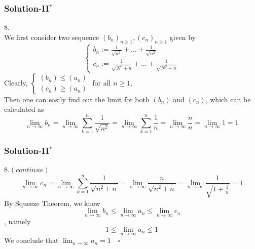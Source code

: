 \documentclass[12pt, t]{beamer}
\begin{document}
\begin{frame}
    \frametitle{Solution-II$^*$}
8.\\
\hspace{1em} We first consider two sequence $(b_n)_{n\geq 1},(c_n)_{n\geq 1}$ given by 
\begin{equation*}
    \begin{cases}
        b_n:=\frac{1}{\sqrt{n^2}}+\dots+\frac{1}{\sqrt{n^2}}\\
        c_n:=\frac{1}{\sqrt{N^2+n}}+\dots+\frac{1}{\sqrt{N^2+n}}
    \end{cases}
\end{equation*}
\hspace{1em} Clearly, 
$\begin{cases}
    (b_n)\leq (a_n)\\
    (c_n)\geq (a_n)
\end{cases}$ 
for all $n\geq 1$. \\
\hspace{1em} Then one can easily find out the limit for both $(b_n)$ and $(c_n)$, which can be calculated as 
\begin{equation*}
    \lim_{n\rightarrow\infty}b_n=\lim_{n\rightarrow \infty}\sum^n_{k=1}\frac{1}{\sqrt{n^2}}=\lim_{n\rightarrow \infty}\sum^n_{k=1}\frac{1}{n}=\lim_{n\rightarrow\infty}\frac{n}{n}=\lim_{n\rightarrow\infty}1=1
\end{equation*}
\end{frame}

\begin{frame}
    \frametitle{Solution-II$^*$}
8.$(continue)$\\
\begin{equation*}
    \lim_{n\rightarrow\infty}c_n=\lim_{n\rightarrow \infty}\sum^n_{k=1}\frac{1}{\sqrt{n^2+n}}=\lim_{n\rightarrow \infty}\frac{n}{\sqrt{n^2+n}}=\lim_{n\rightarrow\infty}\frac{1}{\sqrt{1+\frac{1}{n}}}=1
\end{equation*}
\hspace{1em} By Squeeze Theorem, we know 
\begin{equation*}
    \lim_{n\rightarrow\infty}b_n\leq \lim_{n\rightarrow\infty}a_n\leq \lim_{n\rightarrow\infty}c_n
\end{equation*}
, namely
\begin{equation*}
    1\leq \lim_{n\rightarrow\infty}a_n\leq1
\end{equation*}
We conclude that $ \lim_{n\rightarrow\infty}a_n=1\quad\square$
\end{frame}
\end{document}
